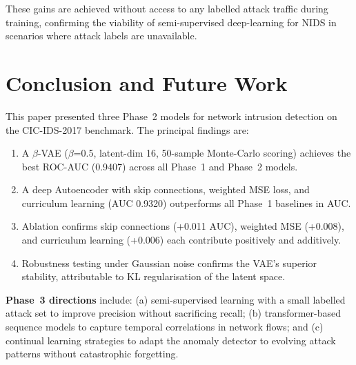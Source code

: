 \documentclass[conference]{IEEEtran}
\begin{document}
These gains are achieved without access to any labelled attack traffic during
training, confirming the viability of semi-supervised deep-learning for NIDS
in scenarios where attack labels are unavailable.

\section{Conclusion and Future Work}
\label{sec:conclusion}

This paper presented three Phase~2 models for network intrusion detection on
the CIC-IDS-2017 benchmark. The principal findings are:

\begin{enumerate}
  \item A $\beta$-VAE ($\beta$=0.5, latent-dim 16, 50-sample Monte-Carlo
    scoring) achieves the best ROC-AUC (0.9407) across all Phase~1 and Phase~2
    models.
  \item A deep Autoencoder with skip connections, weighted MSE loss, and
    curriculum learning (AUC 0.9320) outperforms all Phase~1 baselines in AUC.
  \item Ablation confirms skip connections (+0.011 AUC), weighted MSE
    (+0.008), and curriculum learning (+0.006) each contribute positively and
    additively.
  \item Robustness testing under Gaussian noise confirms the VAE's superior
    stability, attributable to KL regularisation of the latent space.
\end{enumerate}

\textbf{Phase~3 directions} include: (a) semi-supervised learning with a small
labelled attack set to improve precision without sacrificing recall;
(b) transformer-based sequence models to capture temporal correlations in
network flows; and (c) continual learning strategies to adapt the anomaly
detector to evolving attack patterns without catastrophic forgetting.
\end{document}
